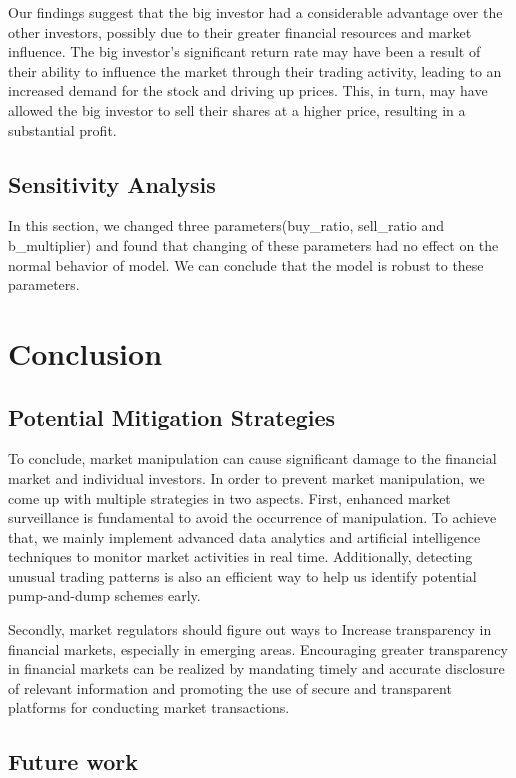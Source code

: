 \documentclass[a4paper, 12pt]{article}
\begin{document}
Our findings suggest that the big investor had a considerable advantage over the other investors, possibly due to their greater financial resources and market influence. The big investor's significant return rate may have been a result of their ability to influence the market through their trading activity, leading to an increased demand for the stock and driving up prices. This, in turn, may have allowed the big investor to sell their shares at a higher price, resulting in a substantial profit.\par

\subsection{Sensitivity Analysis}
 In this section, we changed three parameters(buy\_ratio, sell\_ratio and b\_multiplier) and found that changing of these parameters had no effect on the normal behavior of model. We can conclude that the model is robust to these parameters.

\section{Conclusion}

\subsection{Potential Mitigation Strategies}

To conclude, market manipulation can cause significant damage to the financial market and individual investors. In order to prevent market manipulation, we come up with multiple strategies in two aspects. First, enhanced market surveillance is fundamental to avoid the occurrence of manipulation. To achieve that, we mainly implement advanced data analytics and artificial intelligence techniques to monitor market activities in real time. Additionally, detecting unusual trading patterns is also an efficient way to help us identify potential pump-and-dump schemes early. 

Secondly, market regulators should figure out ways to Increase transparency in financial markets, especially in emerging areas. Encouraging greater transparency in financial markets can be realized by mandating timely and accurate disclosure of relevant information and promoting the use of secure and transparent platforms for conducting market transactions.

\subsection{Future work}
\end{document}
